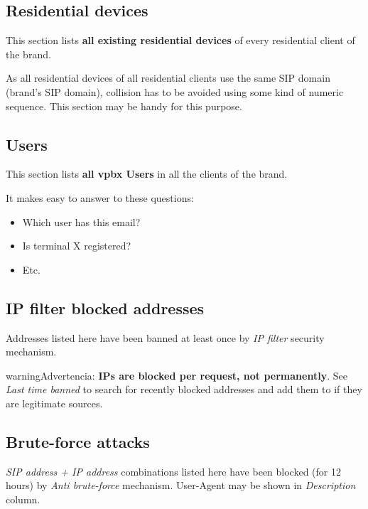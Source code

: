 \documentclass[letterpaper,10pt,spanish]{sphinxmanual}
\begin{document}
\subsection{Residential devices}
\label{administration_portal/brand/views/residential_devices::doc}\label{administration_portal/brand/views/residential_devices:residential-devices}
This section lists \textbf{all existing residential devices} of every residential client of the brand.

As all residential devices of all residential clients use the same SIP domain (brand's SIP domain), collision has to be
avoided using some kind of numeric sequence. This section may be handy for this purpose.


\subsection{Users}
\label{administration_portal/brand/views/users::doc}\label{administration_portal/brand/views/users:users}
This section lists \textbf{all vpbx Users} in all the clients of the brand.

It makes easy to answer to these questions:
\begin{itemize}
\item {} 
Which user has this email?

\item {} 
Is terminal X registered?

\item {} 
Etc.

\end{itemize}


\subsection{IP filter blocked addresses}
\label{administration_portal/brand/views/ipfilter_blocked_addresses:ip-filter-blocked-addresses}\label{administration_portal/brand/views/ipfilter_blocked_addresses::doc}
Addresses listed here have been banned at least once by \emph{IP filter} security mechanism.

\begin{notice}{warning}{Advertencia:}
\textbf{IPs are blocked per request, not permanently}. See \emph{Last time banned} to search for recently blocked
addresses and add them to  if they are legitimate sources.
\end{notice}


\subsection{Brute-force attacks}
\label{administration_portal/brand/views/bruteforce_attacks::doc}\label{administration_portal/brand/views/bruteforce_attacks:brute-force-attacks}
\emph{SIP address + IP address} combinations listed here have been blocked (for 12 hours) by \emph{Anti brute-force} mechanism.
User-Agent may be shown in \emph{Description} column.
\end{document}
